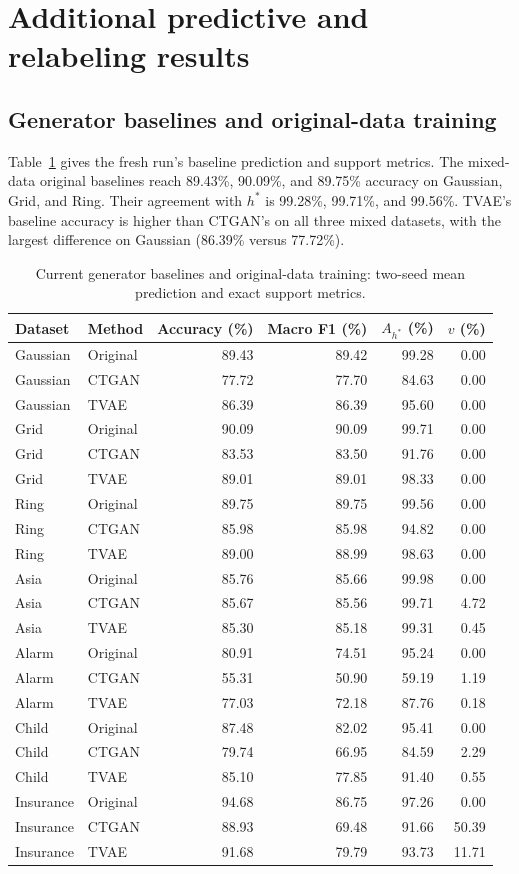 \documentclass[11pt,letterpaper]{article}
\begin{document}
\section{Additional predictive and relabeling results}
\subsection{Generator baselines and original-data training}
Table~\ref{tab:baselines} gives the fresh run's baseline prediction and support metrics. The mixed-data original baselines reach 89.43\%, 90.09\%, and 89.75\% accuracy on Gaussian, Grid, and Ring. Their agreement with $h^*$ is 99.28\%, 99.71\%, and 99.56\%. TVAE's baseline accuracy is higher than CTGAN's on all three mixed datasets, with the largest difference on Gaussian (86.39\% versus 77.72\%).
\begin{table}[H]\centering
\caption{Current generator baselines and original-data training: two-seed mean prediction and exact support metrics.}\label{tab:baselines}
\small
\begin{tabular}{llrrrr}\toprule
Dataset & Method & Accuracy (\%) & Macro F1 (\%) & $A_{h^*}$ (\%) & $v$ (\%)\\\midrule
Gaussian & Original & 89.43 & 89.42 & 99.28 & 0.00\\
Gaussian & CTGAN & 77.72 & 77.70 & 84.63 & 0.00\\
Gaussian & TVAE & 86.39 & 86.39 & 95.60 & 0.00\\
Grid & Original & 90.09 & 90.09 & 99.71 & 0.00\\
Grid & CTGAN & 83.53 & 83.50 & 91.76 & 0.00\\
Grid & TVAE & 89.01 & 89.01 & 98.33 & 0.00\\
Ring & Original & 89.75 & 89.75 & 99.56 & 0.00\\
Ring & CTGAN & 85.98 & 85.98 & 94.82 & 0.00\\
Ring & TVAE & 89.00 & 88.99 & 98.63 & 0.00\\
Asia & Original & 85.76 & 85.66 & 99.98 & 0.00\\
Asia & CTGAN & 85.67 & 85.56 & 99.71 & 4.72\\
Asia & TVAE & 85.30 & 85.18 & 99.31 & 0.45\\
Alarm & Original & 80.91 & 74.51 & 95.24 & 0.00\\
Alarm & CTGAN & 55.31 & 50.90 & 59.19 & 1.19\\
Alarm & TVAE & 77.03 & 72.18 & 87.76 & 0.18\\
Child & Original & 87.48 & 82.02 & 95.41 & 0.00\\
Child & CTGAN & 79.74 & 66.95 & 84.59 & 2.29\\
Child & TVAE & 85.10 & 77.85 & 91.40 & 0.55\\
Insurance & Original & 94.68 & 86.75 & 97.26 & 0.00\\
Insurance & CTGAN & 88.93 & 69.48 & 91.66 & 50.39\\
Insurance & TVAE & 91.68 & 79.79 & 93.73 & 11.71\\
\bottomrule\end{tabular}
\end{table}
\end{document}
